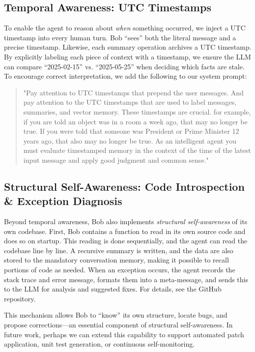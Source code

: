 \documentclass[conference]{IEEEtran}
\begin{document}
\subsection{Temporal Awareness: UTC Timestamps}
To enable the agent to reason about \emph{when} something occurred, 
we inject a UTC timestamp into every human turn. 
Bob ``sees'' both the 
literal message and a precise timestamp. Likewise, each summary operation archives
a UTC timestamp.
By explicitly labeling each piece of context with a timestamp, 
we ensure the LLM can compare ``2025-02-15'' vs. ``2025-05-25'' 
when deciding which facts are stale. To encourage correct interpretation, 
we add the following to our system prompt:
\begin{quote}
  "Pay attention to UTC timestamps that prepend the user messages.  And pay attention to the UTC timestamps that are used to label messages, summaries, and vector memory.  These timestamps are crucial.  for example, if you are told an object was in a room a week ago, that may no longer be true.  If you were told that someone was President or Prime Minister 12 years ago, that also may no longer be true.  As an intelligent agent you must evaluate timestamped memory in the context of the time of the latest input message and apply good judgment and common sense."
\end{quote}

\subsection{Structural Self-Awareness: Code Introspection \& Exception Diagnosis}
Beyond temporal awareness, Bob also implements \emph{structural self-awareness} of its own codebase. 
First, Bob contains a function to read in its own source code and does so on startup.
This reading is done sequentially, and the agent can read the codebase line by line.  
A recursive summary is written, and the data are also stored to the mandatory conversation memory,
making it possible to recall portions of code as needed.  
When an exception occurs, the agent records the stack 
trace and error message, formats them into a meta-message, 
and sends this to the LLM for analysis and suggested fixes. 
For details, see the GitHub repository.

This mechanism allows Bob to ``know'' its own structure, 
locate bugs, and propose corrections—an essential component 
of structural self-awareness. In future work, 
perhaps we can extend this capability to support 
automated patch application, unit test generation, 
or continuous self-monitoring.
\end{document}
